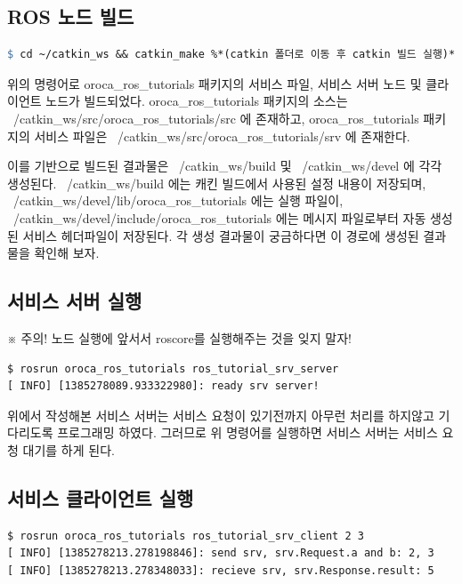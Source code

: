 \subsection{ROS 노드 빌드}

\begin{lstlisting}[language=make]
$ cd ~/catkin_ws && catkin_make %*(catkin 폴더로 이동 후 catkin 빌드 실행)*)
\end{lstlisting}

위의 명령어로 oroca\_ros\_tutorials 패키지의 서비스 파일, 서비스 서버 노드 및 클라이언트 노드가 빌드되었다. oroca\_ros\_tutorials 패키지의 소스는 ~/catkin\_ws/src/oroca\_ros\_tutorials/src 에 존재하고, oroca\_ros\_tutorials 패키지의 서비스 파일은 ~/catkin\_ws/src/oroca\_ros\_tutorials/srv 에 존재한다.

이를 기반으로 빌드된 결과물은 ~/catkin\_ws/build 및 ~/catkin\_ws/devel 에 각각 생성된다. ~/catkin\_ws/build 에는 캐킨 빌드에서 사용된 설정 내용이 저장되며, ~/catkin\_ws/devel/lib/oroca\_ros\_tutorials 에는 실행 파일이, ~/catkin\_ws/devel/include/oroca\_ros\_tutorials 에는 메시지 파일로부터 자동 생성된 서비스 헤더파일이 저장된다. 각 생성 결과물이 궁금하다면 이 경로에 생성된 결과물을 확인해 보자.

\subsection{서비스 서버 실행}

※ 주의! 노드 실행에 앞서서 roscore를 실행해주는 것을 잊지 말자!

\begin{lstlisting}[language=ROS]
$ rosrun oroca_ros_tutorials ros_tutorial_srv_server 
[ INFO] [1385278089.933322980]: ready srv server!
\end{lstlisting}

위에서 작성해본 서비스 서버는 서비스 요청이 있기전까지 아무런 처리를 하지않고 기다리도록 프로그래밍 하였다. 그러므로 위 명령어를 실행하면 서비스 서버는 서비스 요청 대기를 하게 된다.

\subsection{서비스 클라이언트 실행}

\begin{lstlisting}[language=ROS]
$ rosrun oroca_ros_tutorials ros_tutorial_srv_client 2 3
[ INFO] [1385278213.278198846]: send srv, srv.Request.a and b: 2, 3
[ INFO] [1385278213.278348033]: recieve srv, srv.Response.result: 5
\end{lstlisting}

